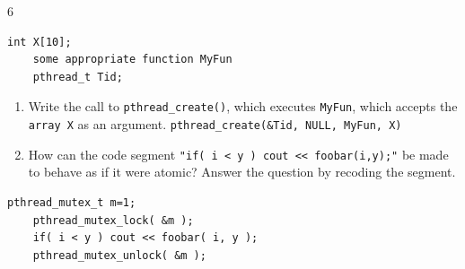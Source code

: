 \documentclass[9pt,landscape]{memoir}
\begin{document}
\begin{multicols}{6}
\begin{lstlisting}[style=cC++,aboveskip=1pt,belowskip=1pt]
    int X[10];
    some appropriate function MyFun
    pthread_t Tid;
\end{lstlisting}

\begin{enumerate}
    \item Write the call to \verb$pthread_create()$, which executes \verb$MyFun$, which accepts the \verb$array X$ as an argument. \verb$pthread_create(&Tid, NULL, MyFun, X)$
    \item How can the code segment \verb$"if( i < y ) cout << foobar(i,y);"$ be made to behave as if it were atomic? Answer the question by recoding the segment.
\end{enumerate}

\begin{lstlisting}[style=cC++,aboveskip=1pt,belowskip=1pt]
    pthread_mutex_t m=1;
    pthread_mutex_lock( &m );
    if( i < y ) cout << foobar( i, y );
    pthread_mutex_unlock( &m );
\end{lstlisting}


\end{multicols}
\end{document}
